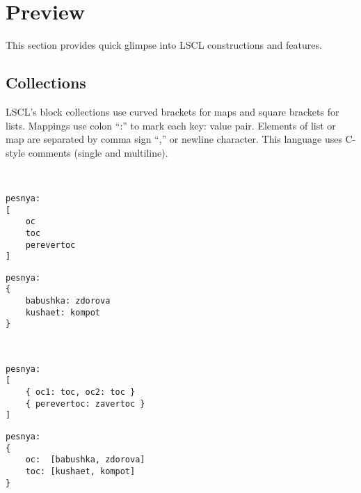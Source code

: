 
\section{Preview}
This section provides quick glimpse into LSCL constructions and features.

\subsection{Collections}
LSCL's block collections use curved brackets for maps and square brackets for lists. Mappings use colon ``:'' to mark each key: value pair. Elements of list or map are separated by comma sign ``,'' or newline character. This language uses C-style comments (single and multiline).

~\\
\begin{minipage}{0.45\textwidth}
\begin{lstlisting}[caption = list]
pesnya:
[
	oc
	toc
	perevertoc
]
\end{lstlisting}
\end{minipage}
\hfill
\begin{minipage}{0.45\textwidth}
\begin{lstlisting}[caption = map]
pesnya:
{
	babushka: zdorova
	kushaet: kompot
}
\end{lstlisting}
\end{minipage}

~\\
\begin{minipage}{0.45\textwidth}
\begin{lstlisting}[caption = list of maps]
pesnya:
[
	{ oc1: toc, oc2: toc }
	{ perevertoc: zavertoc }
]
\end{lstlisting}
\end{minipage}
\hfill
\begin{minipage}{0.45\textwidth}
\begin{lstlisting}[caption = map of lists]
pesnya:
{
	oc:  [babushka, zdorova]
	toc: [kushaet, kompot]
}
\end{lstlisting}
\end{minipage}

